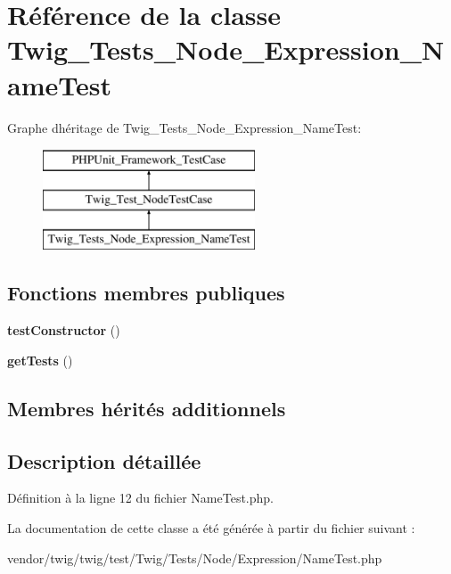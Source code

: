 \hypertarget{class_twig___tests___node___expression___name_test}{}\section{Référence de la classe Twig\+\_\+\+Tests\+\_\+\+Node\+\_\+\+Expression\+\_\+\+Name\+Test}
\label{class_twig___tests___node___expression___name_test}
Graphe d\textquotesingle{}héritage de Twig\+\_\+\+Tests\+\_\+\+Node\+\_\+\+Expression\+\_\+\+Name\+Test\+:\begin{figure}[H]
\begin{center}
\leavevmode
\includegraphics[height=3.000000cm]{class_twig___tests___node___expression___name_test}
\end{center}
\end{figure}
\subsection*{Fonctions membres publiques}
\begin{DoxyCompactItemize}
\item 
{\bfseries test\+Constructor} ()\hypertarget{class_twig___tests___node___expression___name_test_a47094dc941e72950570900d1418f89c6}{}\label{class_twig___tests___node___expression___name_test_a47094dc941e72950570900d1418f89c6}

\item 
{\bfseries get\+Tests} ()\hypertarget{class_twig___tests___node___expression___name_test_a7e247dd31cc8d37a6c97353a062a0080}{}\label{class_twig___tests___node___expression___name_test_a7e247dd31cc8d37a6c97353a062a0080}

\end{DoxyCompactItemize}
\subsection*{Membres hérités additionnels}


\subsection{Description détaillée}


Définition à la ligne 12 du fichier Name\+Test.\+php.



La documentation de cette classe a été générée à partir du fichier suivant \+:\begin{DoxyCompactItemize}
\item 
vendor/twig/twig/test/\+Twig/\+Tests/\+Node/\+Expression/Name\+Test.\+php\end{DoxyCompactItemize}
